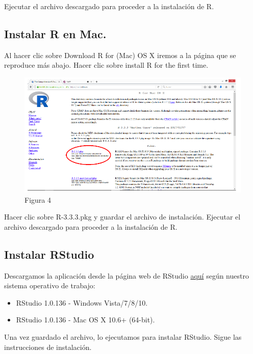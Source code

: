 \documentclass[
]{book}
\begin{document}
Ejecutar el archivo descargado para proceder a la instalación de R.

\hypertarget{instalar-r-en-mac.}{%
\subsection{Instalar R en Mac.}\label{instalar-r-en-mac.}}

Al hacer clic sobre Download R for (Mac) OS X iremos a la página que se reproduce más abajo. Hacer clic sobre install R for the first time.

\begin{figure}
\centering
\includegraphics{imagenes/04.png}
\caption{Figura 4}
\end{figure}

Hacer clic sobre R-3.3.3.pkg y guardar el archivo de instalación. Ejecutar el archivo descargado para proceder a la instalación de R.

\hypertarget{instalar-rstudio}{%
\subsection{Instalar RStudio}\label{instalar-rstudio}}

Descargamos la aplicación desde la página web de RStudio \href{https://posit.co/download/rstudio-desktop/}{aquí} según nuestro sistema operativo de trabajo:

\begin{itemize}
\item
  RStudio 1.0.136 - Windows Vista/7/8/10.
\item
  RStudio 1.0.136 - Mac OS X 10.6+ (64-bit).
\end{itemize}

Una vez guardado el archivo, lo ejecutamos para instalar RStudio. Sigue las instrucciones de instalación.
\end{document}
